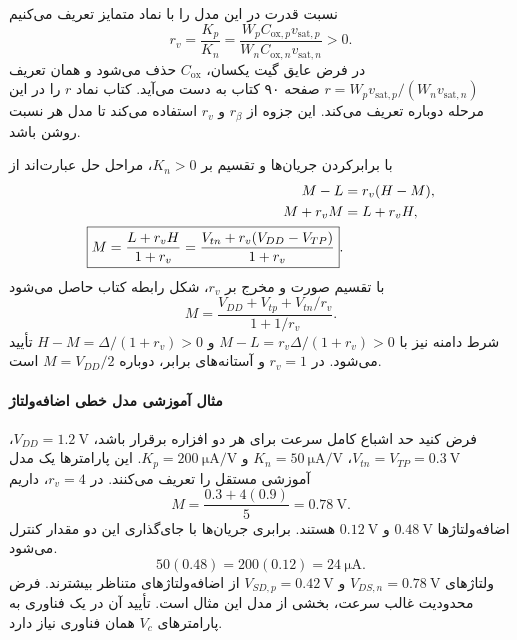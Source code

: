 نسبت قدرت در این مدل را با نماد متمایز تعریف می‌کنیم
\begin{equation}
 \boxed{r_v=\frac{K_p}{K_n}
 =\frac{W_pC_{\mathrm{ox},p}v_{\mathrm{sat},p}}
        {W_nC_{\mathrm{ox},n}v_{\mathrm{sat},n}}}>0.
 \label{eq:beta-velocity-ratio}
\end{equation}
در فرض عایق گیت یکسان، \(C_{\mathrm{ox}}\) حذف می‌شود و همان
تعریف \(r=W_pv_{\mathrm{sat},p}/(W_nv_{\mathrm{sat},n})\)
صفحه ۹۰ کتاب به دست می‌آید. کتاب نماد \(r\) را در این مرحله
دوباره تعریف می‌کند. این جزوه از \(r_\beta\) و \(r_v\) استفاده
می‌کند تا مدل هر نسبت روشن باشد.

با برابرکردن جریان‌ها و تقسیم بر \(K_n>0\)، مراحل حل عبارت‌اند از
\begin{align}
 M-L&=r_v(H-M),\notag\\
 M+r_vM&=L+r_vH,\notag\\
 \boxed{M=\frac{L+r_vH}{1+r_v}
 =\frac{V_{tn}+r_v(V_{DD}-V_{TP})}{1+r_v}}.
 \label{eq:beta-velocity-threshold}
\end{align}
با تقسیم صورت و مخرج بر \(r_v\)، شکل رابطه 
کتاب حاصل می‌شود
\begin{equation}
 M=\frac{V_{DD}+V_{tp}+V_{tn}/r_v}{1+1/r_v}.
 \label{eq:beta-book-velocity-form}
\end{equation}
شرط دامنه نیز با
\(M-L=r_v\Delta/(1+r_v)>0\) و
\(H-M=\Delta/(1+r_v)>0\) تأیید می‌شود.
در \(r_v=1\) و آستانه‌های برابر، دوباره
\(M=V_{DD}/2\) است.

\paragraph*{مثال آموزشی مدل خطی اضافه‌ولتاژ}
فرض کنید حد اشباع کامل سرعت برای هر دو افزاره برقرار باشد،
\(V_{DD}=\qty{1.2}{\volt}\)،
\(V_{tn}=V_{TP}=\qty{0.3}{\volt}\)،
\(K_n=\qty{50}{\micro\ampere\per\volt}\) و
\(K_p=\qty{200}{\micro\ampere\per\volt}\).
این پارامترها یک مدل آموزشی مستقل را تعریف می‌کنند.
در \(r_v=4\)، داریم
\begin{equation*}
 M=\frac{0.3+4(0.9)}{5}=\qty{0.78}{\volt}.
\end{equation*}
اضافه‌ولتاژها \(\qty{0.48}{\volt}\) و \(\qty{0.12}{\volt}\) هستند.
برابری جریان‌ها با جای‌گذاری این دو مقدار کنترل می‌شود.
\[
 50(0.48)=200(0.12)=\qty{24}{\micro\ampere}.
\]
ولتاژهای \(V_{DS,n}=\qty{0.78}{\volt}\) و
\(V_{SD,p}=\qty{0.42}{\volt}\) از اضافه‌ولتاژهای متناظر بیشترند.
فرض محدودیت غالب سرعت، بخشی از مدل این مثال است.
تأیید آن در یک فناوری به پارامترهای \(V_c\) همان فناوری نیاز دارد.

